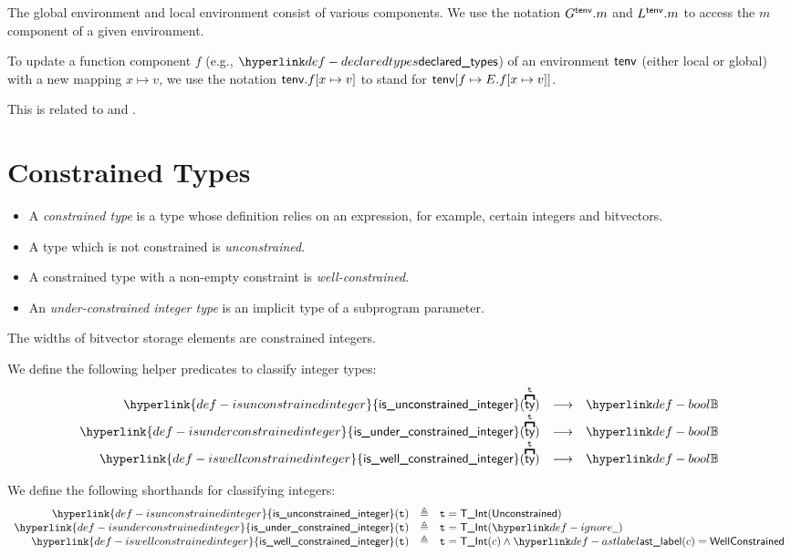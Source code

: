 \documentclass{book}
\newcommand\isunconstrainedinteger[0]{\hyperlink{def-isunconstrainedinteger}{\textsf{is\_unconstrained\_integer}}}
\newcommand\isunderconstrainedinteger[0]{\hyperlink{def-isunderconstrainedinteger}{\textsf{is\_under\_constrained\_integer}}}
\newcommand\iswellconstrainedinteger[0]{\hyperlink{def-iswellconstrainedinteger}{\textsf{is\_well\_constrained\_integer}}}
\newcommand\vt[0]{\texttt{t}}
\begin{document}
The global environment and local environment consist of various components.
We use the notation $G^{\textsf{tenv}}.m$ and $L^{\textsf{tenv}}.m$ to access the $m$ component of a given environment.

To update a function component $f$ (e.g., $\declaredtypes$) of an environment $\textsf{tenv}$ (either local or global)
with a new mapping $x \mapsto v$, we use the notation $\textsf{tenv}.f[x \mapsto v]$ to stand for $\textsf{tenv}[f \mapsto E.f[x \mapsto v]]$.

This is related to  and .

\section{Constrained Types}
\begin{itemize}
  \item A \emph{constrained type} is a type whose definition relies on an expression, for example, certain integers and bitvectors.
  \item A type which is not constrained is \emph{unconstrained}.
  \item A constrained type with a non-empty constraint is \emph{well-constrained}.
  \item An \emph{under-constrained integer type} is an implicit type of a subprogram parameter.
  \end{itemize}
The widths of bitvector storage elements are constrained integers.

\hypertarget{def-isunconstrainedinteger}{}
\hypertarget{def-isunderconstrainedinteger}{}
\hypertarget{def-iswellconstrainedinteger}{}
We define the following helper predicates to classify integer types:
\[
  \begin{array}{rcl}
  \isunconstrainedinteger(\overname{\ty}{\vt}) &\aslto& \Bool\\
  \isunderconstrainedinteger(\overname{\ty}{\vt}) &\aslto& \Bool\\
  \iswellconstrainedinteger(\overname{\ty}{\vt}) &\aslto& \Bool
  \end{array}
\]

We define the following shorthands for classifying integers:
\[
  \begin{array}{rcl}
  \isunconstrainedinteger(\vt) &\triangleq& \vt = \TInt(\unconstrained)\\
  \isunderconstrainedinteger(\vt) &\triangleq& \vt = \TInt(\Ignore)\\
  \iswellconstrainedinteger(\vt) &\triangleq& \vt = \TInt(c) \land \astlabel(c)=\wellconstrained\\
\end{array}
\]
\end{document}
